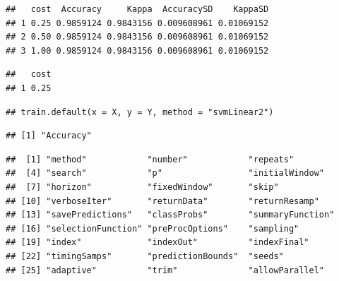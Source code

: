 \documentclass[12pt,spanish,a4paper]{article}
\newenvironment{Shaded}{\begin{snugshade}}{\end{snugshade}}
\newcommand{\KeywordTok}[1]{\textcolor[rgb]{0.13,0.29,0.53}{\textbf{#1}}}
\newcommand{\OperatorTok}[1]{\textcolor[rgb]{0.81,0.36,0.00}{\textbf{#1}}}
\newcommand{\NormalTok}[1]{#1}
\numberwithin{equation}{section}
\begin{document}
\begin{verbatim}
##   cost  Accuracy     Kappa  AccuracySD    KappaSD
## 1 0.25 0.9859124 0.9843156 0.009608961 0.01069152
## 2 0.50 0.9859124 0.9843156 0.009608961 0.01069152
## 3 1.00 0.9859124 0.9843156 0.009608961 0.01069152
\end{verbatim}

\begin{Shaded}
\end{Shaded}

\begin{verbatim}
##   cost
## 1 0.25
\end{verbatim}

\begin{Shaded}
\end{Shaded}

\begin{verbatim}
## train.default(x = X, y = Y, method = "svmLinear2")
\end{verbatim}

\begin{Shaded}
\end{Shaded}

\begin{verbatim}
## [1] "Accuracy"
\end{verbatim}

\begin{Shaded}
\end{Shaded}

\begin{verbatim}
##  [1] "method"            "number"            "repeats"          
##  [4] "search"            "p"                 "initialWindow"    
##  [7] "horizon"           "fixedWindow"       "skip"             
## [10] "verboseIter"       "returnData"        "returnResamp"     
## [13] "savePredictions"   "classProbs"        "summaryFunction"  
## [16] "selectionFunction" "preProcOptions"    "sampling"         
## [19] "index"             "indexOut"          "indexFinal"       
## [22] "timingSamps"       "predictionBounds"  "seeds"            
## [25] "adaptive"          "trim"              "allowParallel"
\end{verbatim}
\end{document}
